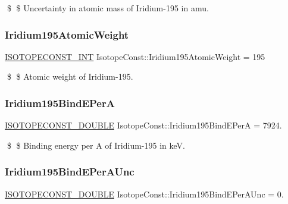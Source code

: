 \$ \$ Uncertainty in atomic mass of Iridium-\/195 in amu. \mbox{\label{group___isotope_const-_iridium-_ir195_ga9fdf5996f67bd35c2b6386e848eef579}} 
\subsubsection{\texorpdfstring{Iridium195\+Atomic\+Weight}{Iridium195AtomicWeight}}
{\footnotesize\ttfamily \mbox{\hyperlink{group___isotope_const-_macros_ga5f18360b3e99483a35c32d789e62621c}{I\+S\+O\+T\+O\+P\+E\+C\+O\+N\+S\+T\+\_\+\+I\+NT}} Isotope\+Const\+::\+Iridium195\+Atomic\+Weight = 195}

\$ \$ Atomic weight of Iridium-\/195. \mbox{\label{group___isotope_const-_iridium-_ir195_gaa8db1fc7e3a52fb33860cb8cbb56f056}} 
\subsubsection{\texorpdfstring{Iridium195\+Bind\+E\+PerA}{Iridium195BindEPerA}}
{\footnotesize\ttfamily \mbox{\hyperlink{group___isotope_const-_macros_ga8f45a7272ce02c0b4c65c44636ed719a}{I\+S\+O\+T\+O\+P\+E\+C\+O\+N\+S\+T\+\_\+\+D\+O\+U\+B\+LE}} Isotope\+Const\+::\+Iridium195\+Bind\+E\+PerA = 7924.}

\$ \$ Binding energy per A of Iridium-\/195 in keV. \mbox{\label{group___isotope_const-_iridium-_ir195_ga71b5b2e536d71af375ded3e040e8a70e}} 
\subsubsection{\texorpdfstring{Iridium195\+Bind\+E\+Per\+A\+Unc}{Iridium195BindEPerAUnc}}
{\footnotesize\ttfamily \mbox{\hyperlink{group___isotope_const-_macros_ga8f45a7272ce02c0b4c65c44636ed719a}{I\+S\+O\+T\+O\+P\+E\+C\+O\+N\+S\+T\+\_\+\+D\+O\+U\+B\+LE}} Isotope\+Const\+::\+Iridium195\+Bind\+E\+Per\+A\+Unc = 0.}

